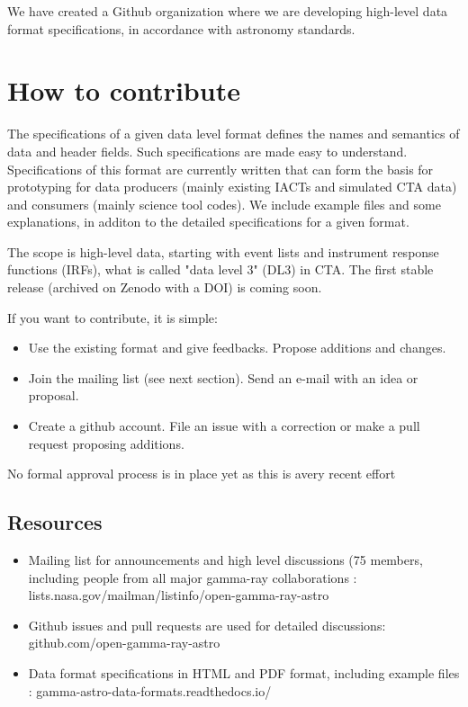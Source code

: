 We have created a  Github organization where we are developing high-level data format specifications, in accordance with astronomy standards. 

\section{How to contribute}

The specifications of a given data level format defines the names and semantics of data and header fields. Such specifications are made easy to understand. Specifications of this format are currently written that can form the basis for prototyping for data producers (mainly existing IACTs and simulated CTA data) and consumers (mainly science tool codes). We include example files and some explanations, in additon to the detailed specifications for a given format. 

The scope is high-level data, starting with event lists and instrument response functions (IRFs), what is called "data level 3" (DL3) in CTA. The first stable release (archived on Zenodo with a DOI) is coming soon.

If you want to contribute, it is simple:

\begin{itemize}
\item{}Use the existing format and give feedbacks. Propose additions and changes.
\item{}Join the mailing list (see next section). Send an e-mail with an idea or proposal.
\item{}Create a github account. File an issue with a correction or make a pull request proposing additions.
\end{itemize}

No formal approval process is in place yet as this is avery recent effort

\subsection{Resources}

\begin{itemize}
\item{}Mailing list for announcements and high level discussions (75 members, including people from all major gamma-ray collaborations : lists.nasa.gov/mailman/listinfo/open-gamma-ray-astro
\item{}Github issues and pull requests are used for detailed discussions: github.com/open-gamma-ray-astro
\item{}Data format specifications in HTML and PDF format, including example files : gamma-astro-data-formats.readthedocs.io/
\end{itemize}

